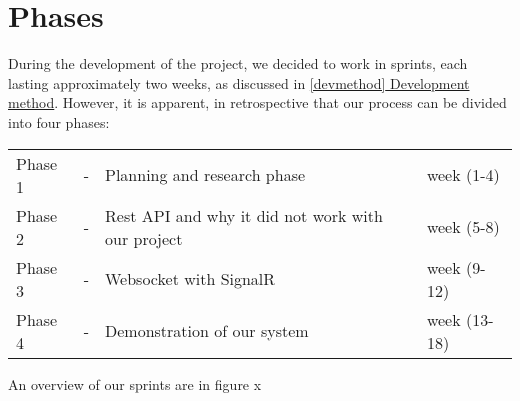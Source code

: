 \chapter{Phases}
During the development of the project, we decided to work in sprints, each lasting approximately two weeks, as discussed in \hyperref[devmethod]{\ref{devmethod} Development method}. However, it is apparent, in retrospective that our process can be divided into four phases:

\begin{center}
	\begin{tabular}{lcll}
		Phase 1 & - & Planning and research phase & week (1-4) \\
		Phase 2& - & Rest API and why it did not work with our project& week (5-8) \\
		Phase 3 & - & Websocket with SignalR & week (9-12) \\
		Phase 4 & - & Demonstration of our system & week (13-18) 
	\end{tabular}
\end{center}

An overview of our sprints are in figure x

%
%
%






